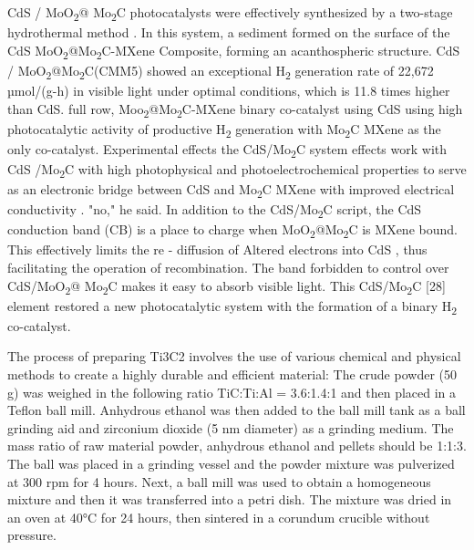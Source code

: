 \begin{multicols}{2}
CdS / MoO\textsubscript{2}@ Mo\textsubscript{2}C photocatalysts
were effectively synthesized by a two-stage hydrothermal method .
In this system, a sediment formed on the surface of the CdS
MoO\textsubscript{2}@Mo\textsubscript{2}C-MXene Composite, forming
an acanthospheric structure. CdS /
MoO\textsubscript{2}@Mo\textsubscript{2}C(CMM5) showed an
exceptional H\textsubscript{2} generation rate of 22,672
µmol/(g-h) in visible light under optimal conditions, which is
11.8 times higher than CdS. full row,
Moo\textsubscript{2}@Mo\textsubscript{2}C-MXene binary co-catalyst
using CdS using high photocatalytic activity of productive
H\textsubscript{2} generation with Mo\textsubscript{2}C MXene as
the only co-catalyst. Experimental effects the
CdS/Mo\textsubscript{2}C system effects work with CdS
/Mo\textsubscript{2}C with high photophysical and
photoelectrochemical properties to serve as an electronic bridge
between CdS and Mo\textsubscript{2}C MXene with improved
electrical conductivity . "no," he said. In addition to the
CdS/Mo\textsubscript{2}C script, the CdS conduction band (CB) is
a place to charge when MoO\textsubscript{2}@Mo\textsubscript{2}C
is MXene bound. This effectively limits the re - diffusion of
Altered electrons into CdS , thus facilitating the operation of
recombination. The band forbidden to control over
CdS/MoO\textsubscript{2}@ Mo\textsubscript{2}C makes it easy to
absorb visible light. This CdS/Mo\textsubscript{2}C {[}28{]}
element restored a new photocatalytic system with the formation
of a binary H\textsubscript{2} co-catalyst.

The process of preparing Ti3C2 involves the use of various
chemical and physical methods to create a highly durable and
efficient material: The crude powder (50 g) was weighed in the
following ratio TiC:Ti:Al = 3.6:1.4:1 and then placed in a
Teflon ball mill. Anhydrous ethanol was then added to the ball
mill tank as a ball grinding aid and zirconium dioxide (5 nm
diameter) as a grinding medium. The mass ratio of raw material
powder, anhydrous ethanol and pellets should be 1:1:3. The
ball was placed in a grinding vessel and the powder mixture
was pulverized at 300 rpm for 4 hours. Next, a ball mill was
used to obtain a homogeneous mixture and then it was transferred
into a petri dish. The mixture was dried in an oven at 40°C for
24 hours, then sintered in a corundum crucible without pressure.


\end{multicols}
